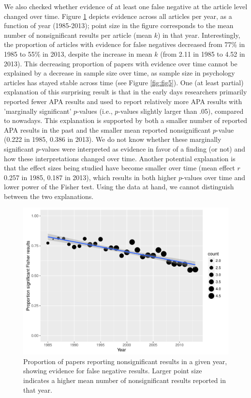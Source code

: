 \documentclass{article}
\begin{document}
We also checked whether evidence of at least one false negative at the article level changed over time. Figure \ref{fig:fig4} depicts evidence across all articles per year, as a function of year (1985-2013); point size in the figure corresponds to the mean number of nonsignificant results per article (mean $k$) in that year. Interestingly, the proportion of articles with evidence for false negatives decreased from 77\% in 1985 to 55\% in 2013, despite the increase in mean $k$ (from 2.11 in 1985 to 4.52 in 2013). This decreasing proportion of papers with evidence over time cannot be explained by a decrease in sample size over time, as sample size in psychology articles has stayed stable across time (see Figure \ref{fig:fig5}). One (at least partial) explanation of this surprising result is that in the early days researchers primarily reported fewer APA results and used to report relatively more APA results with 'marginally significant' $p$-values (i.e., $p$-values slightly larger than .05), compared to nowadays. This explanation is supported by both a smaller number of reported APA results in the past and the smaller mean reported nonsignificant $p$-value (0.222 in 1985, 0.386 in 2013). We do not know whether these marginally significant $p$-values were interpreted as evidence in favor of a finding (or not) and how these interpretations changed over time. Another potential explanation is that the effect sizes being studied have become smaller over time (mean effect $r$ 0.257 in 1985, 0.187 in 2013), which results in both higher $p$-values over time and lower power of the Fisher test. Using the data at hand, we cannot distinguish between the two explanations.

\begin{figure}
\begin{center}
\includegraphics{../figures/Fig4.pdf}
\end{center}
\caption{Proportion of papers reporting nonsignificant results in a given year, showing evidence for false negative results. Larger point size indicates a higher mean number of nonsignificant results reported in that year.}
\label{fig:fig4}
\end{figure}
\end{document}
